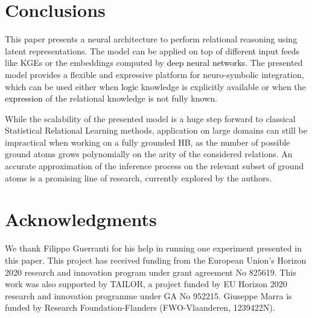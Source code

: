 \documentclass[journal]{IEEEtran}
\newcommand{\ar}[1]{\textcolor{black}{#1}}
\begin{document}
\section{Conclusions}
\label{sec:conclusions}
This paper presents a neural architecture to perform relational reasoning using latent representations. The model can be applied on top of different input feeds like KGEs or the embeddings computed by \ar{deep neural networks}. The presented model provides a flexible and expressive platform for neuro-symbolic integration, which can be used either when \ar{logic} knowledge is explicitly available or when the \ar{expression} of the relational knowledge is not fully known.

While the scalability of the presented model is a huge step forward to classical Statistical Relational Learning methods, application on large domains can still be impractical when working on a fully grounded HB, as the number of possible ground atoms grows polynomially on the arity of the considered relations. %
An accurate approximation of the inference process on the relevant subset of ground atoms is a promising line of research, currently explored by the authors.

\section*{ Acknowledgments} We thank Filippo Guerranti for his help in running one experiment presented in this paper. This project has received funding from the European Union's Horizon 2020 research and innovation program under grant agreement No 825619. This work was also supported by TAILOR, a project funded by EU Horizon 2020 research and innovation programme under GA No 952215. Giuseppe Marra is funded by Research Foundation-Flanders (FWO-Vlaanderen, 1239422N).



\end{document}
